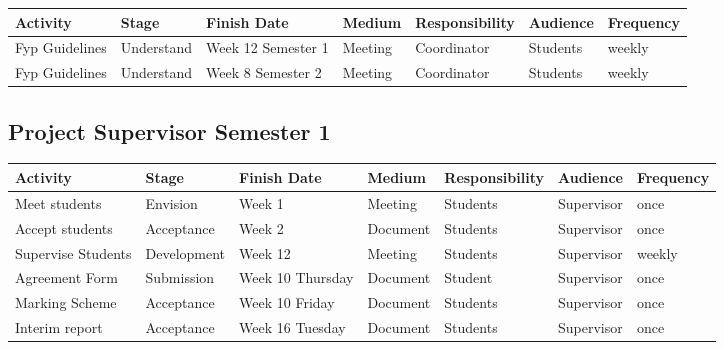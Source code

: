	\begin{center}
	
		\begin{tabular}{ | >{\scriptsize}p{35mm} | >{\scriptsize}p{15mm} | >{\scriptsize}p{25mm} | >{\scriptsize}p{15mm} | >{\scriptsize}p{25mm} | >{\scriptsize}p{15mm} | >{\scriptsize}p{15mm} |}
			\hline

			\textbf{Activity} 		& \textbf{Stage} 	& \textbf{Finish Date} 	& \textbf{Medium} 	& \textbf{Responsibility} 	& \textbf{Audience} 		& \textbf{Frequency} 	\\ \hline
			Fyp Guidelines	 		& Understand 		& Week 12 Semester 1 	& Meeting 			& Coordinator 				& Students	 				& weekly 				\\ \hline
			\rowcolor[gray]{.98}
			Fyp Guidelines	 		& Understand 		& Week 8 Semester 2 	& Meeting 			& Coordinator 				& Students	 				& weekly 				\\ \hline
	
		\end{tabular}
		
	\end{center}
	
	\vspace{6mm}
	
	\subsection{Project Supervisor Semester 1}
	
	\begin{center}
	
		\begin{tabular}{ | >{\scriptsize}p{35mm} | >{\scriptsize}p{15mm} | >{\scriptsize}p{25mm} | >{\scriptsize}p{15mm} | >{\scriptsize}p{25mm} | >{\scriptsize}p{15mm} | >{\scriptsize}p{15mm} |}
			\hline

			\textbf{Activity} 		& \textbf{Stage} 	& \textbf{Finish Date} 	& \textbf{Medium} 	& \textbf{Responsibility} 	& \textbf{Audience} 		& \textbf{Frequency} 	\\ \hline
			Meet students	 		& Envision	 		& Week 1 				& Meeting		 	& Students 					& Supervisor			 	& once 					\\ \hline
			\rowcolor[gray]{.98}
			Accept students 		& Acceptance 		& Week 2 				& Document 			& Students 					& Supervisor 				& once 					\\ \hline
			Supervise Students 		& Development 		& Week 12 			 	& Meeting 			& Students 					& Supervisor 				& weekly 				\\ \hline
			\rowcolor[gray]{.98}
			Agreement Form 			& Submission 		& Week 10 Thursday		& Document 			& Student 					& Supervisor	 			& once 					\\ \hline
			Marking Scheme 			& Acceptance 		& Week 10 Friday 		& Document 			& Students 					& Supervisor	 			& once 					\\ \hline
			\rowcolor[gray]{.98}
			Interim report 			& Acceptance 		& Week 16 Tuesday		& Document 			& Students 					& Supervisor 				& once 					\\ \hline
	
		\end{tabular}
		
	\end{center}
	
